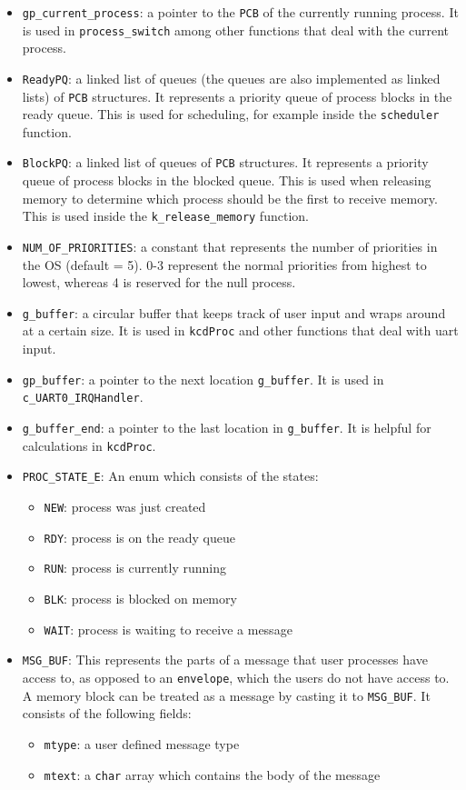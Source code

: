 \documentclass[12pt]{report}
\begin{document}
\begin{itemize}
  \item \texttt{gp_current_process}: a pointer to the \texttt{PCB} of the currently running process. It is used in \texttt{process_switch} among other functions that deal with the current process.
  \item \texttt{ReadyPQ}: a linked list of queues (the queues are also implemented as linked lists) of \texttt{PCB} structures. It represents a priority queue of process blocks in the ready queue. This is used for scheduling, for example inside the \texttt{scheduler} function.
  \item \texttt{BlockPQ}: a linked list of queues of \texttt{PCB} structures. It represents a priority queue of process blocks in the blocked queue. This is used when releasing memory to determine which process should be the first to receive memory.  This is used inside the \texttt{k\_release\_memory} function.
  \item \texttt{NUM_OF_PRIORITIES}: a constant that represents the number of priorities in the OS (default = 5). 0-3 represent the normal priorities from highest to lowest, whereas 4 is reserved for the null process.
  \item \texttt{g_buffer}: a circular buffer that keeps track of user input and wraps around at a certain size. It is used in \texttt{kcdProc} and other functions that deal with uart input.
  \item \texttt{gp_buffer}: a pointer to the next location \texttt{g_buffer}. It is used in \texttt{c_UART0_IRQHandler}.
  \item \texttt{g_buffer_end}: a pointer to the last location in \texttt{g_buffer}. It is helpful for calculations in \texttt{kcdProc}.
  \item \texttt{PROC_STATE_E}: An enum which consists of the states:
    \begin{itemize}
      \item \texttt{NEW}: process was just created
      \item \texttt{RDY}: process is on the ready queue
      \item \texttt{RUN}: process is currently running
      \item \texttt{BLK}: process is blocked on memory
      \item \texttt{WAIT}: process is waiting to receive a message
    \end{itemize}
  \item \texttt{MSG_BUF}: This represents the parts of a message that user processes have access to, as opposed to an \texttt{envelope}, which the users do not have access to. A memory block can be treated as a message by casting it to \texttt{MSG_BUF}.  It consists of the following fields:
    \begin{itemize}
      \item \texttt{mtype}: a user defined message type
      \item \texttt{mtext}: a \texttt{char} array which contains the body of the message
    \end{itemize}
\end{itemize}
\end{document}

